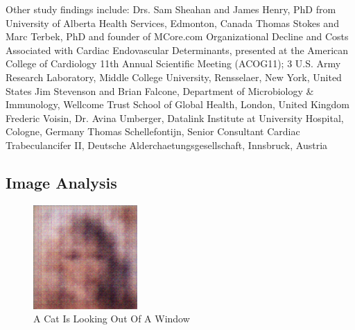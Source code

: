\documentclass{article}%
\begin{document}
Other study findings include:\newline%
Drs. Sam Sheahan and James Henry,\newline%
PhD from University of Alberta Health Services, Edmonton, Canada\newline%
Thomas Stokes and Marc Terbek,\newline%
PhD and founder of MCore.com\newline%
Organizational Decline and Costs Associated with Cardiac Endovascular Determinants, presented at the American College of Cardiology 11th Annual Scientific Meeting (ACOG11); 3\newline%
U.S. Army Research Laboratory,\newline%
Middle College University,\newline%
Rensselaer, New York, United States\newline%
Jim Stevenson and Brian Falcone,\newline%
Department of Microbiology \& Immunology,\newline%
Wellcome Trust School of Global Health,\newline%
London, United Kingdom\newline%
Frederic Voisin,\newline%
Dr. Avina Umberger,\newline%
Datalink Institute at University Hospital,\newline%
Cologne, Germany\newline%
Thomas Schellefontijn,\newline%
Senior Consultant Cardiac Trabeculancifer II,\newline%
Deutsche Alderchaetungsgesellschaft,\newline%
Innsbruck, Austria

%
\subsection{Image Analysis}%
\label{subsec:ImageAnalysis}%


\begin{figure}[h!]%
\centering%
\includegraphics[width=150px]{500_fake_images/samples_5_152.png}%
\caption{A Cat Is Looking Out Of A Window}%
\end{figure}

%
\end{document}
